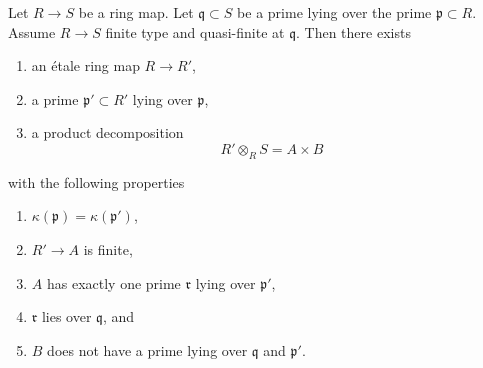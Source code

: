 \begin{lemma}
\label{lemma-etale-makes-quasi-finite-finite-one-prime}
Let $R \to S$ be a ring map.
Let $\mathfrak q \subset S$ be a prime lying over
the prime $\mathfrak p \subset R$.
Assume $R \to S$ finite type and quasi-finite at $\mathfrak q$.
Then there exists
\begin{enumerate}
\item an \'etale ring map $R \to R'$,
\item a prime $\mathfrak p' \subset R'$ lying over $\mathfrak p$,
\item a product decomposition
$$
R' \otimes_R S = A \times B
$$
\end{enumerate}
with the following properties
\begin{enumerate}
\item $\kappa(\mathfrak p) = \kappa(\mathfrak p')$,
\item $R' \to A$ is finite,
\item $A$ has exactly one prime $\mathfrak r$ lying over $\mathfrak p'$,
\item $\mathfrak r$ lies over $\mathfrak q$, and
\item $B$ does not have a prime lying over $\mathfrak q$ and $\mathfrak p'$.
\end{enumerate}
\end{lemma}

